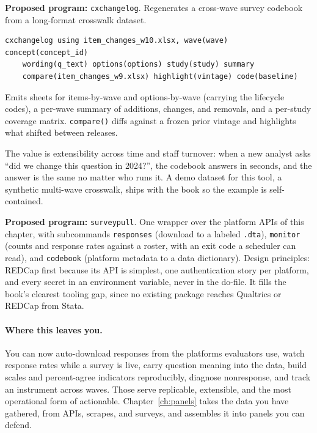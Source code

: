\documentclass[
    a4paper,
    fontsize=10pt,
    twoside=true,
    numbers=noenddot,
]{kaobook}
\begin{document}
\begin{kaobox}[frametitle=Ado-file Idea: \texttt{cxchangelog}]
\textbf{Proposed program:} \texttt{cxchangelog}. Regenerates a cross-wave survey codebook from a long-format crosswalk dataset.
{\footnotesize
\begin{verbatim}
cxchangelog using item_changes_w10.xlsx, wave(wave) concept(concept_id)
    wording(q_text) options(options) study(study) summary
    compare(item_changes_w9.xlsx) highlight(vintage) code(baseline)
\end{verbatim}
}
Emits sheets for items-by-wave and options-by-wave (carrying the lifecycle codes), a per-wave summary of additions, changes, and removals, and a per-study coverage matrix. \texttt{compare()} diffs against a frozen prior vintage and highlights what shifted between releases.
\end{kaobox}

The value is extensibility across time and staff turnover: when a new analyst asks \enquote{did we change this question in 2024?}, the codebook answers in seconds, and the answer is the same no matter who runs it. A demo dataset for this tool, a synthetic multi-wave crosswalk, ships with the book so the example is self-contained. %

\begin{kaobox}[frametitle=Ado-file Idea: \texttt{surveypull}]
\textbf{Proposed program:} \texttt{surveypull}. One wrapper over the platform APIs of this chapter, with subcommands \texttt{responses} (download to a labeled \texttt{.dta}), \texttt{monitor} (counts and response rates against a roster, with an exit code a scheduler can read), and \texttt{codebook} (platform metadata to a data dictionary). Design principles: REDCap first because its API is simplest, one authentication story per platform, and every secret in an environment variable, never in the do-file. It fills the book's clearest tooling gap, since no existing package reaches Qualtrics or REDCap from Stata.
\end{kaobox}

\paragraph{Where this leaves you.} You can now auto-download responses from the platforms evaluators use, watch response rates while a survey is live, carry question meaning into the data, build scales and percent-agree indicators reproducibly, diagnose nonresponse, and track an instrument across waves. Those serve replicable, extensible, and the most operational form of actionable. Chapter~\ref{ch:panels} takes the data you have gathered, from APIs, scrapes, and surveys, and assembles it into panels you can defend.
\end{document}
